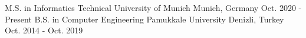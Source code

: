 

\begin{cventries}

  \cventry
  {M.S. in Informatics} %
  {Technical University of Munich} %
  {Munich, Germany} %
  {Oct. 2020 - Present} %
  {}
  \cventry
  {B.S. in Computer Engineering} %
  {Pamukkale University} %
  {Denizli, Turkey} %
  {Oct. 2014 - Oct. 2019} %
  {}
\end{cventries}
